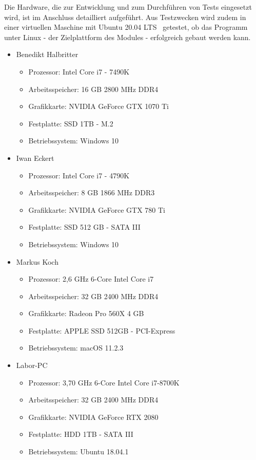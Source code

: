 Die Hardware, die zur Entwicklung und zum Durchf\"uhren von Tests eingesetzt wird, ist im Anschluss detailliert aufgef\"uhrt.
Aus Testzwecken wird zudem in einer virtuellen Maschine mit Ubuntu 20.04 LTS~\cite{ubuntu} getestet, ob das Programm unter Linux - der Zielplattform des Modules - erfolgreich gebaut werden kann.

\newpage

\begin{itemize}
    \item Benedikt Halbritter
    \begin{itemize}
        \item Prozessor: Intel Core i7 - 7490K
        \item Arbeitsspeicher: 16 GB 2800 MHz DDR4
        \item Grafikkarte: NVIDIA GeForce GTX 1070 Ti
        \item Festplatte: SSD 1TB - M.2
        \item Betriebssystem: Windows 10
    \end{itemize}
    \item Iwan Eckert
    \begin{itemize}
        \item Prozessor: Intel Core i7 - 4790K
        \item Arbeitsspeicher: 8 GB 1866 MHz DDR3
        \item Grafikkarte: NVIDIA GeForce GTX 780 Ti
        \item Festplatte: SSD 512 GB - SATA III
        \item Betriebssystem: Windows 10
    \end{itemize}
    \item Markus Koch
    \begin{itemize}
        \item Prozessor: 2,6 GHz 6-Core Intel Core i7
        \item Arbeitsspeicher: 32 GB 2400 MHz DDR4
        \item Grafikkarte: Radeon Pro 560X 4 GB
        \item Festplatte: APPLE SSD 512GB - PCI-Express
        \item Betriebssystem: macOS 11.2.3
    \end{itemize}
    \item Labor-PC
    \begin{itemize}
        \item Prozessor: 3,70 GHz 6-Core Intel Core i7-8700K
        \item Arbeitsspeicher: 32 GB 2400 MHz DDR4
        \item Grafikkarte: NVIDIA GeForce RTX 2080
        \item Festplatte: HDD 1TB - SATA III
        \item Betriebssystem: Ubuntu 18.04.1
    \end{itemize}
\end{itemize}

